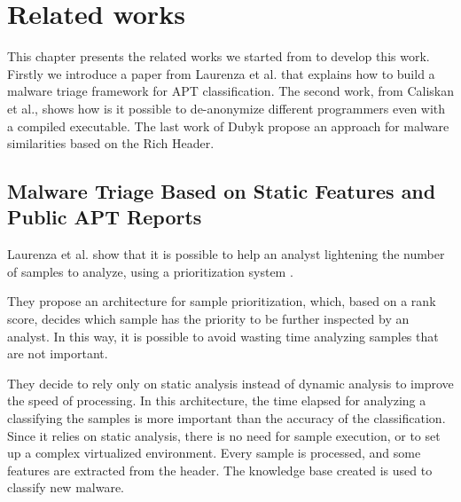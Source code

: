 \chapter{Related works}
\label{ch:rel-works}

This chapter presents the related works we started from to develop this work. Firstly we introduce a paper from Laurenza et al. that explains how to build a malware triage framework for APT classification. The second work, from Caliskan et al., shows how is it possible to de-anonymize different programmers even with a compiled executable. The last work of Dubyk propose an approach for malware similarities based on the Rich Header.

\section{Malware Triage Based on Static Features and Public APT Reports}
Laurenza et al. show that it is possible to help an analyst lightening the number of samples to analyze, using a prioritization system \cite{laurenza2017malware}. 

They propose an architecture for sample prioritization, which, based on a rank score, decides which sample has the priority to be further inspected by an analyst. In this way, it is possible to avoid wasting time analyzing samples that are not important. 

They decide to rely only on static analysis instead of dynamic analysis to improve the speed of processing. In this architecture, the time elapsed for analyzing a classifying the samples is more important than the accuracy of the classification. Since it relies on static analysis, there is no need for sample execution, or to set up a complex virtualized environment. Every sample is processed, and some features are extracted from the header. The knowledge base created is used to classify new malware.


